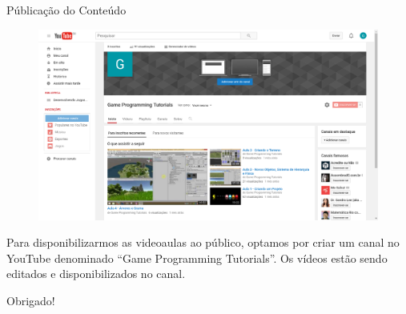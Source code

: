 \documentclass[10pt]{beamer}
\begin{document}
\begin{frame}{Públicação do Conteúdo}

\begin{figure}[H]
		\centering
		\begin{minipage}[b]{0.7\textwidth}
		\includegraphics[width=\textwidth]{figuras/publicacao.png}
		\end{minipage}
\end{figure}


Para disponibilizarmos as videoaulas ao público, optamos por criar um canal no YouTube denominado ``Game Programming Tutorials''.
Os vídeos estão sendo editados e disponibilizados no canal.

\end{frame}



\begin{frame}
	\begin{center}
		\centering
		\vskip 0.5cm
		\Huge Obrigado!
	\end{center}
\end{frame}
\end{document}
